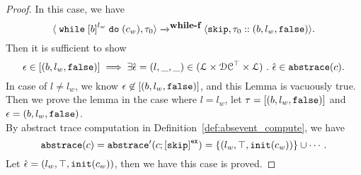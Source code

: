 \begin{proof}
    In this case, we have
    \[
      \config{{\ewhile \clabel{b}^{l_w} \edo (c_w), \trace_0}}
      \xrightarrow{}^\rname{while-f}
      \config{{
      \eskip,
      \trace_0 :: (b, l_w, \efalse)}}.
    \]
    Then it is sufficient to show
      \[
        \mathtt{\epsilon} \in [(b, l_w, \mathtt{false})]
        \implies
        \exists \hat{\mathtt{\epsilon}{}} = (l, \_, \_) \in (\mathcal{L}\times \mathcal{DC}^{\top} \times \mathcal{L}) ~.~ 
        \hat{\mathtt{\epsilon}{}} \in \mathtt{abs}{\mathtt{trace}}(c).
      \]
      In case of $l \neq l_w$, we know $\mathtt{\epsilon} \not\in [(b, l_w, \mathtt{false})]$, and this Lemma is vacuously true.
      \\
      Then we prove the lemma in the case where $l = l_w$, 
      let $\mathtt{\tau} = [(b, l_w, \mathtt{false})]$ and $\mathtt{\epsilon} = (b, l_w, \mathtt{false})$.
    \\
    By abstract trace computation in Definition~\ref{def:absevent_compute}, we have
    \[
      \absflow(c) = \absflow'(c; \clabel{\eskip}^{\lex}) = \{(l_w, \top, \init(c_w))\} \cup \cdots.
    \]
    Let $\hat{\mathtt{\epsilon}{}} = (l_w, \top, \mathtt{init}(c_w))$, then we have this case is proved.

\end{proof}
